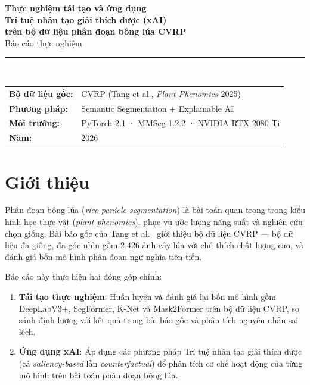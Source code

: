 \documentclass[12pt, a4paper]{article}
\begin{document}
\begin{titlepage}
\centering
\vspace*{2cm}
{\LARGE \textbf{Thực nghiệm tái tạo và ứng dụng\\[0.3em]
Trí tuệ nhân tạo giải thích được (xAI)\\[0.3em]
trên bộ dữ liệu phân đoạn bông lúa CVRP}}\\[1.5cm]
{\large Báo cáo thực nghiệm}\\[1cm]

\rule{0.6\linewidth}{0.5pt}\\[1cm]

\begin{tabular}{@{}ll}
\textbf{Bộ dữ liệu gốc:}  & CVRP (Tang et al., \textit{Plant Phenomics} 2025)\\[4pt]
\textbf{Phương pháp:}      & Semantic Segmentation + Explainable AI\\[4pt]
\textbf{Môi trường:}       & PyTorch 2.1 · MMSeg 1.2.2 · NVIDIA RTX 2080 Ti\\[4pt]
\textbf{Năm:}              & 2026\\
\end{tabular}

\vfill
\end{titlepage}

\tableofcontents
\listoffigures
\listoftables
\newpage

\section{Giới thiệu}
\label{sec:intro}

Phân đoạn bông lúa (\textit{rice panicle segmentation}) là bài toán quan trọng trong kiểu hình học thực vật (\textit{plant phenomics}), phục vụ ước lượng năng suất và nghiên cứu chọn giống. Bài báo gốc của Tang et al.~\cite{tang2025cvrp} giới thiệu bộ dữ liệu CVRP --- bộ dữ liệu đa giống, đa góc nhìn gồm 2.426 ảnh cây lúa với chú thích chất lượng cao, và đánh giá bốn mô hình phân đoạn ngữ nghĩa tiên tiến.

Báo cáo này thực hiện hai đóng góp chính:
\begin{enumerate}[label=(\arabic*)]
  \item \textbf{Tái tạo thực nghiệm}: Huấn luyện và đánh giá lại bốn mô hình gồm DeepLabV3+, SegFormer, K-Net và Mask2Former trên bộ dữ liệu CVRP, so sánh định lượng với kết quả trong bài báo gốc và phân tích nguyên nhân sai lệch.
  \item \textbf{Ứng dụng xAI}: Áp dụng các phương pháp Trí tuệ nhân tạo giải thích được (cả \textit{saliency-based} lẫn \textit{counterfactual}) để phân tích cơ chế hoạt động của từng mô hình trên bài toán phân đoạn bông lúa.
\end{enumerate}
\end{document}

